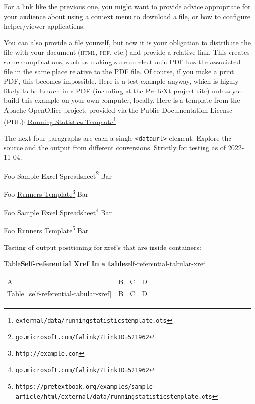 \documentclass{sn-jnl}
\theoremstyle{thmstyleone}%
\theoremstyle{thmstyletwo}%
\theoremstyle{thmstylethree}%
\newcommand{\tabularfont}{\relax}
\newcommand{\xreffont}{\relax}
\newcommand{\mono}[1]{\texttt{#1}}
\newcommand{\initialism}[1]{\textsc{\MakeLowercase{#1}}}
\numberwithin{equation}{section}
\newcommand{\hrulemedium}{\noalign{\hrule height 0.07em}}
\begin{document}
\par
For a link like the previous one, you might want to provide advice appropriate for your audience about using a context menu to download a file, or how to configure helper\slash{}viewer applications.%
\par
You can also provide a file yourself, but now it is your obligation to distribute the file with your document (\initialism{HTML}, \initialism{PDF}, etc.\@) and provide a relative link.  This creates some complications, such as making sure an electronic PDF has the associated file in the same place relative to the PDF file.  Of course, if you make a print PDF, this becomes impossible.  Here is a test example anyway, which is highly likely to be broken in a PDF (including at the PreTeXt project site) unless you build this example on your own computer, locally.  Here is a template from the Apache OpenOffice project, provided via the Public Documentation License (PDL):  \href{external/data/runningstatisticstemplate.ots}{Running Statistics Template}\footnote{\nolinkurl{external/data/runningstatisticstemplate.ots}\label{section-cross-referencing-18-6}}.%
\par
The next four paragraphs are each a single \mono{<dataurl>} element.  Explore the source and the output from different conversions.  Strictly for testing as of 2022-11-04.%
\par
Foo \href{http://go.microsoft.com/fwlink/?LinkID=521962}{Sample Excel Spreadsheet}\footnote{\nolinkurl{go.microsoft.com/fwlink/?LinkID=521962}\label{section-cross-referencing-20-2}} Bar%
\par
Foo \href{https://pretextbook.org/examples/sample-article/html/external/data/runningstatisticstemplate.ots}{Runners Template}\footnote{\nolinkurl{http://example.com}\label{section-cross-referencing-21-2}} Bar%
\par
Foo \href{http://go.microsoft.com/fwlink/?LinkID=521962}{Sample Excel Spreadsheet}\footnote{\nolinkurl{go.microsoft.com/fwlink/?LinkID=521962}\label{section-cross-referencing-22-2}} Bar%
\par
Foo \href{https://pretextbook.org/examples/sample-article/html/external/data/runningstatisticstemplate.ots}{Runners Template}\footnote{\nolinkurl{https://pretextbook.org/examples/sample-article/html/external/data/runningstatisticstemplate.ots}\label{section-cross-referencing-23-2}} Bar%
\par
Testing of output positioning for xref's that are inside containers:%
\begin{tableptx}{Table}{\textbf{Self-referential Xref In a table}}{self-referential-tabular-xref}{}%
\centering%
{\tabularfont%
\begin{tabular}{llll}
A&B&C&D\tabularnewline\hrulemedium
\hyperref[self-referential-tabular-xref]{Table~{\xreffont\ref{self-referential-tabular-xref}}}&B&C&D
\end{tabular}
}%
\end{tableptx}%
\end{document}

